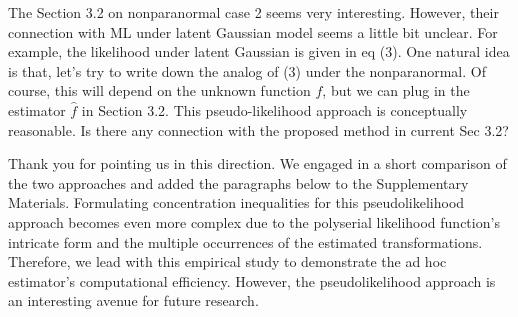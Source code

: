 \begin{point}
    The Section 3.2 on nonparanormal case 2 seems very interesting. However, their connection with ML under latent Gaussian model seems a little bit unclear. For example, the likelihood under latent Gaussian is given in eq (3). One natural idea is that, let's try to write down the analog of (3) under the nonparanormal. Of course, this will depend on the unknown function \(f\), but we can plug in the estimator \(\hat{f}\) in Section 3.2. This pseudo-likelihood approach is conceptually reasonable. Is there any connection with the proposed method in current Sec 3.2?
\end{point}

\begin{reply}
    Thank you for pointing us in this direction. We engaged in a short comparison of the two approaches and added the paragraphs below to the Supplementary Materials. Formulating concentration inequalities for this pseudolikelihood approach becomes even more complex due to the polyserial likelihood function's intricate form and the multiple occurrences of the estimated transformations. Therefore, we lead with this empirical study to demonstrate the ad hoc estimator's computational efficiency. However, the pseudolikelihood approach is an interesting avenue for future research.
\end{reply}

